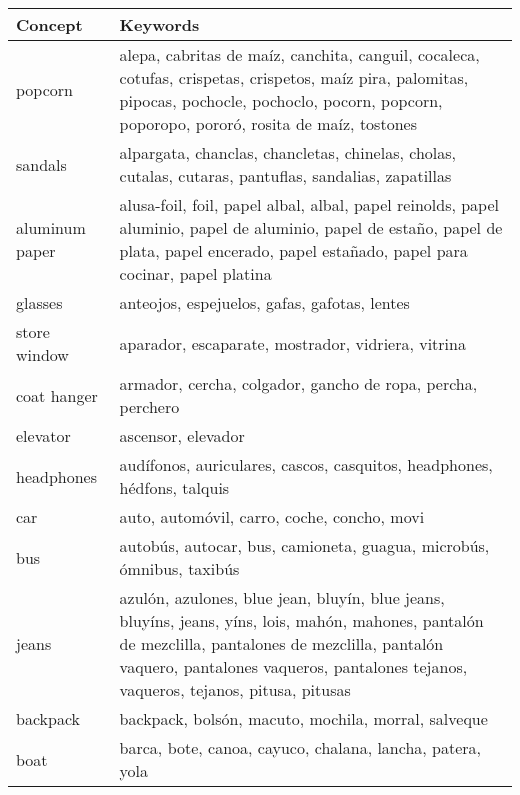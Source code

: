 \documentclass[11pt]{article}
\begin{document}
\begin{table}[t]
\begin{center}
\begin{tabularx}{\linewidth}{l X}
\hline \bf Concept & \bf Keywords \\ \hline
popcorn & alepa, cabritas de maíz, canchita, canguil, cocaleca, cotufas, crispetas, crispetos, maíz pira, palomitas, pipocas, pochocle, pochoclo, pocorn, popcorn, poporopo, pororó, rosita de maíz, tostones \\
sandals & alpargata, chanclas, chancletas, chinelas, cholas, cutalas, cutaras, pantuflas, sandalias, zapatillas \\
aluminum paper & alusa-foil, foil, papel albal, albal, papel reinolds, papel aluminio, papel de aluminio, papel de estaño, papel de plata, papel encerado, papel estañado, papel para cocinar, papel platina \\
glasses & anteojos, espejuelos, gafas, gafotas, lentes \\
store window & aparador, escaparate, mostrador, vidriera, vitrina \\
coat hanger & armador, cercha, colgador, gancho de ropa, percha, perchero \\
elevator & ascensor, elevador \\
headphones & audífonos, auriculares, cascos, casquitos, headphones, hédfons, talquis \\
car & auto, automóvil, carro, coche, concho, movi \\
bus & autobús, autocar, bus, camioneta, guagua, microbús, ómnibus, taxibús \\
jeans & azulón, azulones, blue jean, bluyín, blue jeans, bluyíns, jeans, yíns, lois, mahón, mahones, pantalón de mezclilla, pantalones de mezclilla, pantalón vaquero, pantalones vaqueros, pantalones tejanos, vaqueros, tejanos, pitusa, pitusas \\
backpack & backpack, bolsón, macuto, mochila, morral, salveque \\
boat & barca, bote, canoa, cayuco, chalana, lancha, patera, yola \\
\hline
\end{tabularx}
\end{center}
\end{table}
\end{document}
